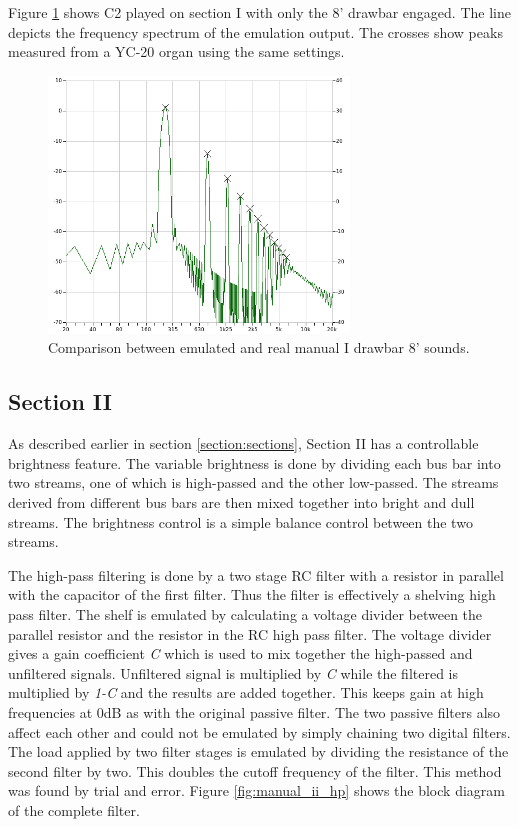 \documentclass[11pt,a4paper]{article}
\begin{document}
Figure \ref{fig:comp_manual_i} shows C2 played on section I with only the 8' drawbar engaged. The line depicts the frequency spectrum of the emulation output. The crosses show peaks measured from a YC-20 organ using the same settings.

\begin{figure}[tbp]
\centering
\includegraphics[width=80mm]{analysis/manual_i_compare.png}
\caption{Comparison between emulated and real manual I drawbar 8' sounds.}
\label{fig:comp_manual_i}
\end{figure}



\subsection{Section II}

As described earlier in section \ref{section:sections}, Section II has a controllable brightness feature. The variable brightness is done by dividing each bus bar into two streams, one of which is high-passed and the other low-passed. The streams derived from different bus bars are then mixed together into bright and dull streams. The brightness control is a simple balance control between the two streams. 


The high-pass filtering is done by a two stage RC filter with a resistor in parallel with the capacitor of the first filter. Thus the filter is effectively a shelving high pass filter. The shelf is emulated by calculating a voltage divider between the parallel resistor and the resistor in the RC high pass filter. The voltage divider gives a gain coefficient \emph{C} which is used to mix together the high-passed and unfiltered signals. Unfiltered signal is multiplied by \emph{C} while the filtered is multiplied by \emph{1-C} and the results are added together. This keeps gain at high frequencies at 0dB as with the original passive filter. The two passive filters also affect each other and could not be emulated by simply chaining two digital filters. The load applied by two filter stages is emulated by dividing the resistance of the second filter by two. This doubles the cutoff frequency of the filter. This method was found by trial and error. Figure \ref{fig:manual_ii_hp} shows the block diagram of the complete filter.
\end{document}
